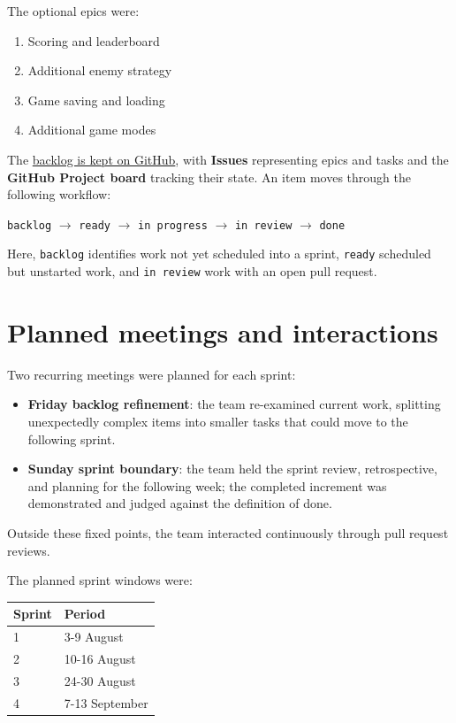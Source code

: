 The optional epics were:

\begin{enumerate}[resume]
    \item Scoring and leaderboard
    \item Additional enemy strategy
    \item Game saving and loading
    \item Additional game modes
\end{enumerate}

The \href{https://github.com/PPS-25/PPS-25-scala-man/issues}{backlog is kept on GitHub}, with \textbf{Issues} representing epics
and tasks and the \textbf{GitHub Project board} tracking their state. An item moves through the following workflow:

\begin{center}
  \texttt{backlog} $\rightarrow$ \texttt{ready} $\rightarrow$ \texttt{in progress} $\rightarrow$
  \texttt{in review} $\rightarrow$ \texttt{done}
\end{center}

Here, \texttt{backlog} identifies work not yet scheduled into a sprint, \texttt{ready} scheduled but unstarted work,
and \texttt{in review} work with an open pull request.

\section{Planned meetings and interactions}
Two recurring meetings were planned for each sprint:

\begin{itemize}
  \item \textbf{Friday backlog refinement}: the team re-examined current work, splitting unexpectedly complex items
  into smaller tasks that could move to the following sprint.
  \item \textbf{Sunday sprint boundary}: the team held the sprint review, retrospective, and planning for the following
  week; the completed increment was demonstrated and judged against the definition of done.
\end{itemize}

Outside these fixed points, the team interacted continuously through pull request reviews.

The planned sprint windows were:
\begin{center}
    \begin{tabular}{|l|l|}
        \hline
        \textbf{Sprint} & \textbf{Period} \\
        \hline
        1 & 3-9 August \\
        2 & 10-16 August \\
        3 & 24-30 August \\
        4 & 7-13 September \\
        \hline
    \end{tabular}
\end{center}


